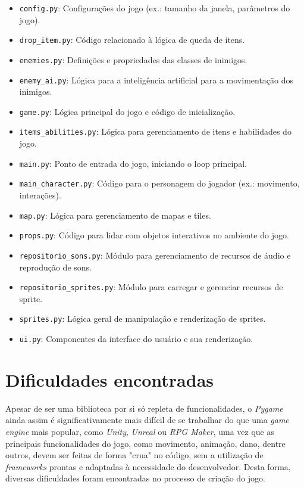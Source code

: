 \documentclass[a4paper,12pt]{article}
\begin{document}
\begin{itemize}
    \item \texttt{config.py}: Configurações do jogo (ex.: tamanho da janela, parâmetros do jogo).
    \item \texttt{drop\_item.py}: Código relacionado à lógica de queda de itens.
    \item \texttt{enemies.py}: Definições e propriedades das classes de inimigos.
    \item \texttt{enemy\_ai.py}: Lógica para a inteligência artificial para a movimentação dos inimigos.
    \item \texttt{game.py}: Lógica principal do jogo e código de inicialização.
    \item \texttt{items\_abilities.py}: Lógica para gerenciamento de itens e habilidades do jogo.
    \item \texttt{main.py}: Ponto de entrada do jogo, iniciando o loop principal.
    \item \texttt{main\_character.py}: Código para o personagem do jogador (ex.: movimento, interações).
    \item \texttt{map.py}: Lógica para gerenciamento de mapas e tiles.
    \item \texttt{props.py}: Código para lidar com objetos interativos no ambiente do jogo.
    \item \texttt{repositorio\_sons.py}: Módulo para gerenciamento de recursos de áudio e reprodução de sons.
    \item \texttt{repositorio\_sprites.py}: Módulo para carregar e gerenciar recursos de sprite.
    \item \texttt{sprites.py}: Lógica geral de manipulação e renderização de sprites.
    \item \texttt{ui.py}: Componentes da interface do usuário e sua renderização.
\end{itemize}

\section{Dificuldades encontradas}

Apesar de ser uma biblioteca por si só repleta de funcionalidades, o \textit{Pygame} ainda assim é significativamente mais difícil de se trabalhar do que uma \textit{game engine} mais popular, como \textit{Unity}, \textit{Unreal} ou \textit{RPG Maker}, uma vez que as principais funcionalidades do jogo, como movimento, animação, dano, dentre outros, devem ser feitas de forma "crua" \space no código, sem a utilização de \textit{frameworks} prontas e adaptadas à necessidade do desenvolvedor. Desta forma, diversas dificuldades foram encontradas no processo de criação do jogo.
\end{document}
